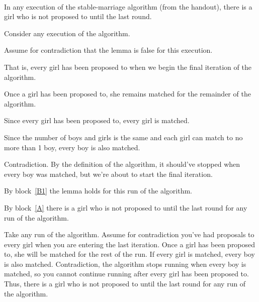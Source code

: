 \documentclass[11pt]{article}
\begin{document}
\begin{problems}
~

  \lineacross 

  \begin{lemma}
    In any execution of the stable-marriage algorithm (from the handout),
    there is a girl who is not proposed to until the last round.
  \end{lemma}

  \begin{longFormProof}

    \begin{block}[A]
      {Consider any execution of the algorithm.}

      \begin{block}[B1]    %
        {Assume for contradiction that the lemma is false for this execution.}

        \step That is, every girl has been proposed to when we begin the final iteration of the algorithm.

        \step Once a girl has been proposed to, she remains matched for the remainder of the algorithm.

        \step Since every girl has been proposed to, every girl is matched.

        \step Since the number of boys and girls is the same and each girl can match to no more than 1 boy, every boy is also matched.

        \step Contradiction. By the definition of the algorithm, it should've stopped when every boy was matched, 
              but we're about to start the final iteration.

      \end{block}

      \step By block~\ref{B1} the lemma holds for this run of the algorithm.

    \end{block}

    \step By block~\ref{A} there is a girl who is not proposed to until the last round for any run of the algorithm.

  \end{longFormProof}

  \begin{shortFormProof}
    Take any run of the algorithm. Assume for contradiction you've had proposals to every girl when you are 
    entering the last iteration. Once a girl has been proposed to, she will be matched for the rest of the run. 
    If every girl is matched, every boy is also matched. Contradiction, the algorithm stops running when every 
    boy is matched, so you cannot continue running after every girl has been proposed to. Thus, there is a girl 
    who is not proposed to until the last round for any run of the algorithm.
  \end{shortFormProof}

\end{problems}
\end{document}
